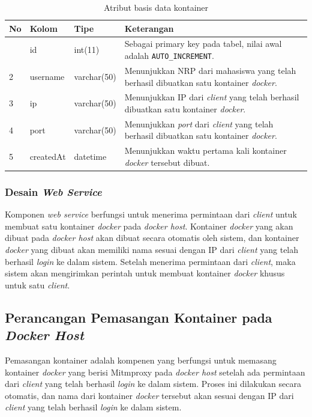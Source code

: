 \begin{longtable}{|p{}|p{}|p{}|p{}|}
	\caption{Atribut basis data kontainer} \label{tabelkontainer} \\
	\hline
	\textbf{No} & \textbf{Kolom} & \textbf{Tipe} & \textbf{Keterangan} \\ \hline
	\endhead
	\endfoot
	\endlastfoot
	1 & id & int(11) & Sebagai primary key pada tabel, nilai awal adalah \texttt{AUTO\_INCREMENT}. \\ \hline
	2 & username & varchar(50) & Menunjukkan NRP dari mahasiswa yang telah berhasil dibuatkan satu kontainer \textit{docker}. \\ \hline
	3 & ip & varchar(50) & Menunjukkan IP dari \textit{client} yang telah berhasil dibuatkan satu kontainer \textit{docker}. \\ \hline
	4 & port & varchar(50) & Menunjukkan \textit{port} dari \textit{client} yang telah berhasil dibuatkan satu kontainer \textit{docker}. \\ \hline
	5 & createdAt & datetime & Menunjukkan waktu pertama kali kontainer \textit{docker} tersebut dibuat. \\ \hline
	
\end{longtable}


\subsubsection{Desain \textit{Web Service}}
Komponen \textit{web service} berfungsi untuk menerima permintaan dari \textit{client} untuk membuat satu kontainer \textit{docker} pada \textit{docker host}. Kontainer \textit{docker} yang akan dibuat pada \textit{docker host} akan dibuat secara otomatis oleh sistem, dan kontainer \textit{docker} yang dibuat akan memiliki nama sesuai dengan IP dari \textit{client} yang telah berhasil \textit{login} ke dalam sistem. Setelah menerima permintaan dari \textit{client}, maka sistem akan mengirimkan perintah untuk membuat kontainer \textit{docker} khusus untuk satu \textit{client}. 

\subsection{Perancangan Pemasangan Kontainer pada \textit{Docker Host}}
Pemasangan kontainer adalah kompenen yang berfungsi untuk memasang kontainer \textit{docker} yang berisi Mitmproxy pada \textit{docker host} setelah ada permintaan dari \textit{client} yang telah berhasil \textit{login} ke dalam sistem. Proses ini dilakukan secara otomatis, dan nama dari kontainer \textit{docker} tersebut akan sesuai dengan IP dari \textit{client} yang telah berhasil \textit{login} ke dalam sistem.

